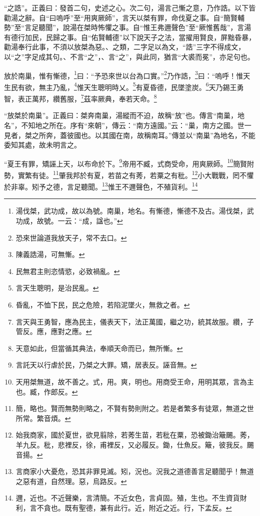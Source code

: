 {\noindent\shu{}\fzkt “之誥”。正義曰：發首二句，史述之心。次二句，湯言己慚之意，乃作誥。以下皆勸湯之辭。自“曰嗚呼”至“用爽厥師”，言天以桀有罪，命伐夏之事。自“簡賢輔勢”至“言足聽聞”，說湯在桀時怖懼之事。自“惟王弗邇聲色”至“厥惟舊哉”，言湯有德行加民，民歸之事。自“佑賢輔德”以下說天子之法，當擢用賢良，屏黜昏暴，勸湯奉行此事，不須以放桀為惡。、之類，二字足以為文，“誥”三字不得成文，以“之”字足成其句。、不言“之”，、言“之”，與此同，猶言“大裘而冕”，亦足句也。 \par}

放於南巢，惟有慚德，\footnote{湯伐桀，武功成，故以為號。南巢，地名。有慚德，慚德不及古。湯伐桀，武功成，故號。一云：“成，諡也。”}曰：“予恐來世以台為口實。”\footnote{恐來世論道我放天子，常不去口。}乃作誥，\footnote{陳義誥湯，可無慚。}曰：“嗚呼！惟天生民有欲，無主乃亂，\footnote{民無君主則恣情慾，必致禍亂。}惟天生聰明時乂。\footnote{言天生聰明，是治民亂。}有夏昏德，民墜塗炭。\footnote{昏亂，不恤下民，民之危險，若陷泥墜火，無救之者。}天乃錫王勇智，表正萬邦，纘舊服，\footnote{言天與王勇智，應為民主，儀表天下，法正萬國，繼之功，統其故服。纘，子管反。應，應對之應。}茲率厥典，奉若天命。\footnote{天意如此，但當循其典法，奉順天命而已，無所慚。}

{\noindent\shu{}\fzkt “放桀於南巢”。正義曰：桀奔南巢，湯縱而不迫，故稱“放”也。傳言“南巢，地名”，不知地之所在。序有“來朝”，傳云：“南方遠國。”云：“巢，南方之國。世一見者，桀之所奔，蓋彼國也。以其國在南，故稱南耳。”傳並以“南巢”為地名，不能委知其處，故未明言之。 \par}

“夏王有罪，矯誣上天，以布命於下。\footnote{言託天以行虐於民，乃桀之大罪。矯，居表反。誣音無。}帝用不臧，式商受命，用爽厥師。\footnote{天用桀無道，故不善之。式，用。爽，明也。用商受王命，用明其眾，言為主也。臧，作郎反。}簡賢附勢，實繁有徒。\footnote{簡，略也。賢而無勢則略之，不賢有勢則附之。若是者繁多有徒眾，無道之世所常。繁音煩。}肇我邦於有夏，若苗之有莠，若粟之有秕。\footnote{始我商家，國於夏世，欲見翦除，若莠生苗，若秕在粟，恐被鋤治簸颺。莠，羊九反。秕，悲裡反，徐，甫裡反，又必履反。鋤，仕魚反。簸，彼我反。颺音揚。}小大戰戰，罔不懼於非辜。矧予之德，言足聽聞。\footnote{言商家小大憂危，恐其非罪見滅。矧，況也。況我之道德善言足聽聞乎！無道之惡有道，自然理。惡，烏路反。}惟王不邇聲色，不殖貨利。\footnote{邇，近也。不近聲樂，言清簡。不近女色，言貞固。殖，生也。不生資貨財利，言不貪也。既有聖德，兼有此行。近，附近之近。行，下孟反。}


